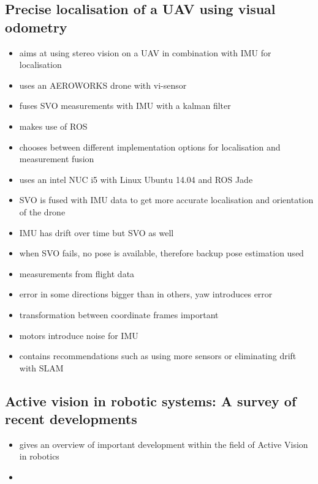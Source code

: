 \subsection{Precise localisation of a UAV using visual odometry}
\begin{itemize}
	\item aims at using stereo vision on a UAV in combination with IMU for localisation
	\item uses an AEROWORKS drone with vi-sensor
	\item fuses SVO measurements with IMU with a kalman filter
	\item makes use of ROS
	\item chooses between different implementation options for localisation and measurement fusion
	\item uses an intel NUC i5 with Linux Ubuntu 14.04 and ROS Jade
	\item SVO is fused with IMU data to get more accurate localisation and orientation of the drone
	\item IMU has drift over time but SVO as well
	\item when SVO fails, no pose is available, therefore backup pose estimation used
	\item measurements from flight data
	\item error in some directions bigger than in others, yaw introduces error
	\item transformation between coordinate frames important
	\item motors introduce noise for IMU
	\item contains recommendations such as using more sensors or eliminating drift with SLAM
\end{itemize}

\subsection{Active vision in robotic systems: A survey of recent developments}
\begin{itemize}
	\item gives an overview of important development within the field of Active Vision in robotics
	\item 
\end{itemize}